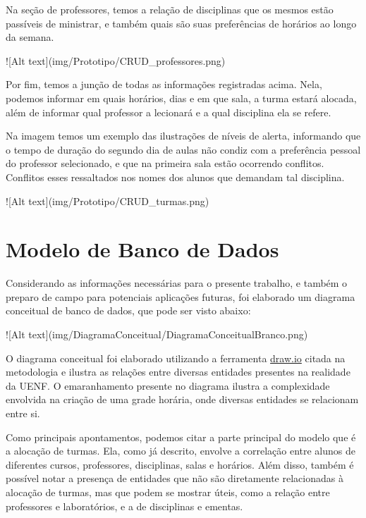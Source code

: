     Na seção de professores, temos a relação de disciplinas que os mesmos estão passíveis de ministrar, e também quais são suas preferências de horários ao longo da semana.

    ![Alt text](img/Prototipo/CRUD_professores.png)

    Por fim, temos a junção de todas as informações registradas acima. Nela, podemos informar em quais horários, dias e em que sala, a turma estará alocada, além de informar qual professor a lecionará e a qual disciplina ela se refere.

    Na imagem temos um exemplo das ilustrações de níveis de alerta, informando que o tempo de duração do segundo dia de aulas não condiz com a preferência pessoal do professor selecionado, e que na primeira sala estão ocorrendo conflitos. Conflitos esses ressaltados nos nomes dos alunos que demandam tal disciplina.

    ![Alt text](img/Prototipo/CRUD_turmas.png)

\section{Modelo de Banco de Dados} %

    Considerando as informações necessárias para o presente trabalho, e também o preparo de campo para potenciais aplicações futuras, foi elaborado um diagrama conceitual de banco de dados, que pode ser visto abaixo:

    ![Alt text](img/DiagramaConceitual/DiagramaConceitualBranco.png)


    O diagrama conceitual foi elaborado utilizando a ferramenta \href{https://www.drawio.com/}{draw.io} citada na metodologia e ilustra as relações entre diversas entidades presentes na realidade da UENF. O emaranhamento presente no diagrama ilustra a complexidade envolvida na criação de uma grade horária, onde diversas entidades se relacionam entre si.

    Como principais apontamentos, podemos citar a parte principal do modelo que é a alocação de turmas. Ela, como já descrito, envolve a correlação entre alunos de diferentes cursos, professores, disciplinas, salas e horários. Além disso, também é possível notar a presença de entidades que não são diretamente relacionadas à alocação de turmas, mas que podem se mostrar úteis, como a relação entre professores e laboratórios, e a de disciplinas e ementas.

